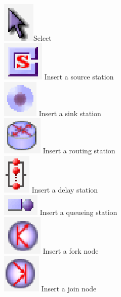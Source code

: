 \\
\includegraphics[scale=.5]{img/jsimg/select}Select\\
\includegraphics[scale=.5]{img/jsimg/insertSource} Insert a source
station\\
\includegraphics[scale=.5]{img/jsimg/insertSink} Insert a sink station\\
\includegraphics[scale=.5]{img/jsimg/insertRouter} Insert a routing
station\\
\includegraphics[scale=.5]{img/jsimg/insertDelay} Insert a delay station\\
\includegraphics[scale=.5]{img/jsimg/insertServer} Insert a queueing station\\
\includegraphics[scale=.5]{img/jsimg/insertFork} Insert a fork node\\
\includegraphics[scale=.5]{img/jsimg/insertJoin}  Insert a join node\\
